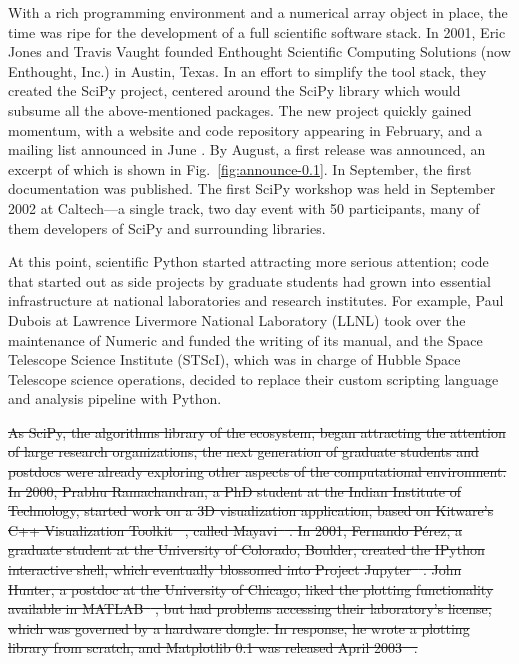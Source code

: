\documentclass[fleqn,10pt]{wlscirep}
\providecommand{\DIFdel}[1]{{\protect\color{red}\sout{#1}}}                      %
\providecommand{\DIFdelbegin}{} %
\begin{document}
With a rich programming environment and a numerical array object in
place, the time was ripe for the development of a full scientific
software stack.
In 2001, Eric Jones and Travis Vaught founded Enthought Scientific
Computing Solutions (now Enthought, Inc.) in Austin, Texas.  In an
effort to simplify the tool stack, they created the SciPy project,
centered around the SciPy library which would subsume all the
above-mentioned packages.
The new project quickly gained momentum, with a website and code
repository appearing in
February\cite{archived-scipyorg}, and
a mailing list announced in
June \cite{new-scipy-list}. By
August, a first release was announced\cite{first-scipy-rel}, an excerpt of which is shown in
Fig.~\ref{fig:announce-0.1}.
In September, the first documentation was
published\cite{first-scipy-docs}.
The first SciPy
workshop\cite{first-scipy-workshop}
was held in September 2002 at Caltech---a single track, two day event with 50
participants, many of them developers of SciPy and surrounding libraries.



At this point, scientific Python started attracting more serious attention;
code that started out as side projects by graduate students had grown into
essential infrastructure at national laboratories and research institutes.
For example, Paul Dubois at Lawrence Livermore National Laboratory (LLNL) took over the
maintenance of Numeric and funded the writing of its
manual\cite{Numeric-manual}, and
the Space Telescope Science Institute (STScI), which was in charge of
Hubble Space Telescope science operations, decided to replace their
custom scripting language and analysis pipeline with Python\cite{STScI-slither}.
\DIFdelbegin %

\DIFdel{As SciPy, the algorithms library of the ecosystem, began attracting the attention
of large research organizations,
the next generation of graduate students and postdocs were already exploring
other aspects of the computational environment.
In 2000, Prabhu Ramachandran, a PhD student at the Indian Institute of
Technology, started work on a 3D visualization application, based on
Kitware's C++ Visualization Toolkit\mbox{%
\cite{schroeder:2006:VTK}}\hspace{0pt}%
, called
Mayavi\mbox{%
\cite{mayavi-intro}}\hspace{0pt}%
.
In 2001, Fernando Pérez, a graduate student at the University of
Colorado, Boulder, created the IPython interactive shell, which
eventually blossomed into Project Jupyter\mbox{%
\cite{Kluyver:2016aa}}\hspace{0pt}%
.
John Hunter, a postdoc
at the University
of Chicago, liked the plotting functionality
available in MATLAB\mbox{%
\cite{matlab}}\hspace{0pt}%
, but had problems accessing their laboratory's
license, which was governed by a hardware dongle.  In response, he
wrote a plotting library from scratch, and Matplotlib 0.1 was released
April 2003\mbox{%
\cite{matplotlib-rel}}\hspace{0pt}%
.
}%
\end{document}
